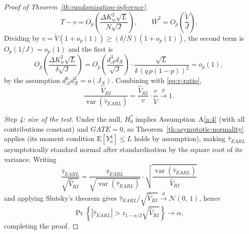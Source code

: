 \documentclass[sigconf]{acmart}
\newcounter{assumption}
\newcommand{\E}{\mathrm E}
\DeclareMathOperator{\var}{var}
\begin{document}
\begin{proof}[Proof of Theorem~\ref{th:randomisation-inference}]
\begin{equation*}
        T - v = O_p\left(\frac{\Delta K_w^2\sqrt L}{N\sqrt J}\right),\qquad
        \bar W^2 = O_p\left(\frac{\tilde V}{J}\right).
    \end{equation*}
    Dividing by $v = \tilde V(1+o_p(1)) \ge (\delta/N)(1+o_p(1))$, the second term is $O_p(1/J) = o_p(1)$ and the first is
    \begin{equation*}
        O_p\left(\frac{\Delta K_w^2\sqrt L }{\delta\sqrt J}\right) = O_p\left(\frac{d^3_{\mathcal A}d_{\mathcal R}}{\sqrt{J}}\right)\cdot\frac{\sqrt L}{\delta\,(q\,p(1-p))^2} = o_p(1),
    \end{equation*}
    by the assumption $d^6_{\mathcal A}d^2_{\mathcal R} = o(J_N)$. Combining with \eqref{eq:v-ratio},
    \begin{equation*}
        \frac{\hat V_{RI}}{\var(\hat\tau^{\phantom{1}}_{EARL})} = \frac{\hat V_{RI}}{v}\cdot\frac{v}{\tilde V}\stackrel{p}{\to}1.
    \end{equation*}

    \emph{Step 4: size of the test.} Under the null, $H_0^*$ implies Assumption~A\ref{a:4} (with all contributions constant) and $GATE=0$, so Theorem~\ref{th:asymptotic-normality} applies (its moment condition $\E[Y_a^4]\le L$ holds by assumption), making $\hat\tau_{EARL}$ asymptotically standard normal after standardisation by the square root of its variance. Writing
    \begin{equation*}
        \frac{\hat\tau^{\phantom{1}}_{EARL}}{\sqrt{\hat V_{RI}}} = \frac{\hat\tau^{\phantom{1}}_{EARL}}{\sqrt{\var\left(\hat\tau^{\phantom{1}}_{EARL}\right)}} \cdot \sqrt{\frac{\var\left(\hat\tau^{\phantom{1}}_{EARL}\right)}{\hat V_{RI}}}
    \end{equation*}
    and applying Slutsky's theorem gives $\hat\tau_{EARL}/\sqrt{\hat V_{RI}}\stackrel{d}{\to}\mathcal N(0,\,1)$, hence
    \begin{equation*}
        \Pr\left\{\left|\hat\tau^{\phantom{1}}_{EARL}\right| > z_{1-\alpha/2}\sqrt{\hat V_{RI}}\right\}\to \alpha,
    \end{equation*}
    completing the proof.
\end{proof}
\end{document}
